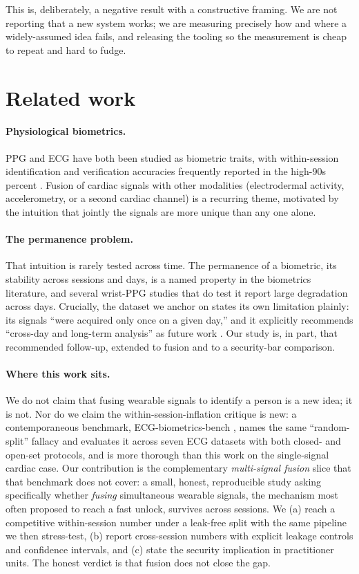 \documentclass[11pt]{article}
\begin{document}
This is, deliberately, a negative result with a constructive framing. We are not reporting
that a new system works; we are measuring precisely how and where a widely-assumed idea fails,
and releasing the tooling so the measurement is cheap to repeat and hard to fudge.

\section{Related work}
\label{sec:related}

\paragraph{Physiological biometrics.} PPG and ECG have both been studied as biometric traits,
with within-session identification and verification accuracies frequently reported in the
high-90s percent \citep{blasco2018}. Fusion of cardiac signals with other modalities
(electrodermal activity, accelerometry, or a second cardiac channel) is a recurring theme,
motivated by the intuition that jointly the signals are more unique than any one alone.

\paragraph{The permanence problem.} That intuition is rarely tested across time. The
permanence of a biometric, its stability across sessions and days, is a named property
in the biometrics literature, and several wrist-PPG studies that do test it report large
degradation across days. Crucially, the dataset we anchor on states its own limitation
plainly: its signals ``were acquired only once on a given day,'' and it explicitly recommends
``cross-day and long-term analysis'' as future work \citep{blasco2018}. Our study is, in part,
that recommended follow-up, extended to fusion and to a security-bar comparison.

\paragraph{Where this work sits.} We do not claim that fusing wearable signals to identify a
person is a new idea; it is not. Nor do we claim the within-session-inflation critique is new:
a contemporaneous benchmark, ECG-biometrics-bench \citep{ecgbench2026}, names the same
``random-split'' fallacy and evaluates it across seven ECG datasets with both closed- and
open-set protocols, and is more thorough than this work on the single-signal cardiac case. Our
contribution is the complementary \emph{multi-signal fusion} slice that that benchmark does not
cover: a small, honest, reproducible study asking specifically whether \emph{fusing}
simultaneous wearable signals, the mechanism most often proposed to reach a fast unlock,
survives across sessions. We (a) reach a competitive within-session number under a leak-free
split with the same pipeline we then stress-test, (b) report cross-session numbers with
explicit leakage controls and confidence intervals, and (c) state the security implication in
practitioner units. The honest verdict is that fusion does not close the gap.
\end{document}
